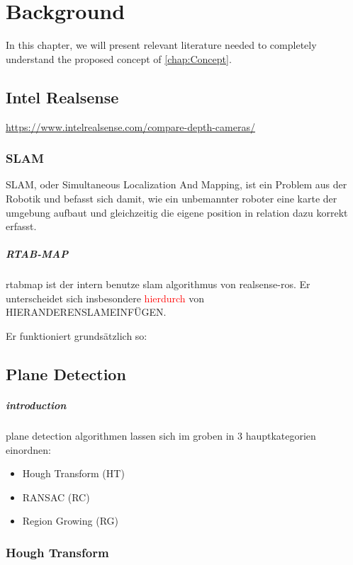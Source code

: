 \documentclass[main.tex]{subfiles}
\begin{document}
\chapter{Background}\label{chap:Background}
In this chapter, we will present relevant literature needed to completely understand the proposed concept of \autoref{chap:Concept}.


\section{Intel Realsense}
\href{https://www.intelrealsense.com/compare-depth-cameras/}{https://www.intelrealsense.com/compare-depth-cameras/}

\subsection*{SLAM}
SLAM, oder Simultaneous Localization And Mapping, ist ein Problem aus der Robotik und befasst sich damit, wie ein unbemannter roboter eine karte der umgebung aufbaut und gleichzeitig die eigene position in relation dazu korrekt erfasst.


\paragraph*{RTAB-MAP}
rtabmap ist der intern benutze slam algorithmus von realsense-ros. Er unterscheidet sich insbesondere \textcolor{red}{hierdurch} von HIERANDERENSLAMEINFÜGEN.

Er funktioniert grundsätzlich so:

\section{Plane Detection}

\paragraph*{introduction}
plane detection algorithmen lassen sich im groben in 3 hauptkategorien einordnen:
\begin{itemize}
    \item Hough Transform (HT)
    \item RANSAC (RC)
    \item Region Growing (RG)
\end{itemize}

\subsection*{Hough Transform}
\end{document}
